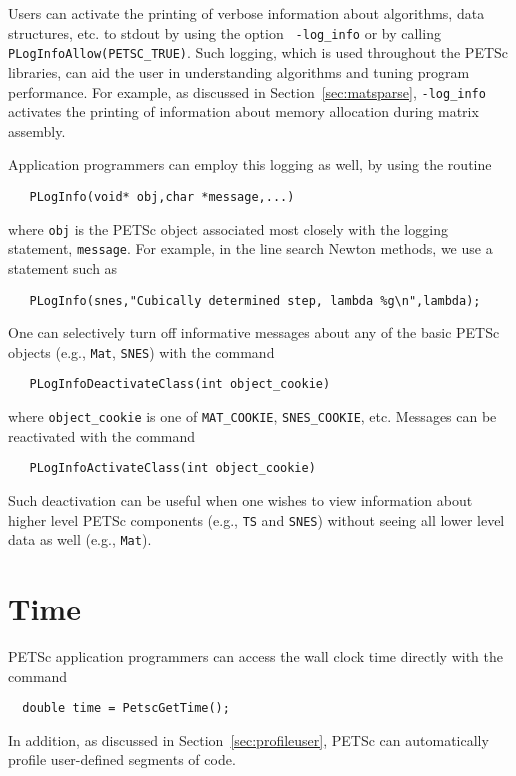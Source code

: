Users can activate the printing of verbose information about
algorithms, data structures, etc. to stdout by using the option {\tt
-log\_info}  or by calling {\tt
PLogInfoAllow(PETSC\_TRUE)}. 
Such logging, which is used throughout the PETSc libraries,
can aid the user in understanding algorithms and 
tuning program performance.  For example, as discussed in
Section~\ref{sec:matsparse}, {\tt -log\_info} activates the
printing of information about memory allocation during
matrix assembly.

Application programmers can employ this logging as well, by
using the routine 
\begin{verbatim}
   PLogInfo(void* obj,char *message,...)
\end{verbatim}
where {\tt obj} is the PETSc object associated most closely with
the logging statement, {\tt message}.
For example, in the line search Newton methods, we use a statement such as
\begin{verbatim}
   PLogInfo(snes,"Cubically determined step, lambda %g\n",lambda);
\end{verbatim}

One can selectively turn off informative messages about any of the 
basic PETSc objects (e.g., {\tt Mat}, {\tt SNES}) with the command
\begin{verbatim}
   PLogInfoDeactivateClass(int object_cookie)
\end{verbatim}
where  
{\tt object\_cookie} is one of {\tt MAT\_COOKIE}, {\tt SNES\_COOKIE}, etc.
Messages can be reactivated with the command
\begin{verbatim}
   PLogInfoActivateClass(int object_cookie)
\end{verbatim}
Such deactivation can be useful when one wishes to view information
about higher level PETSc components (e.g., {\tt TS} and {\tt SNES}) without 
seeing all lower level data as well (e.g., {\tt Mat}).

\section{Time}

PETSc application programmers can access the wall clock time directly 
with the command 
\begin{verbatim}
  double time = PetscGetTime();
\end{verbatim}
 
In addition, as discussed in Section~\ref{sec:profileuser},
PETSc can automatically profile user-defined segments of code.


